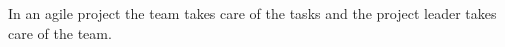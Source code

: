\begin{savequote}[75mm]
In an agile project the team takes care of the tasks and the project leader takes care of the team.
\end{savequote}


